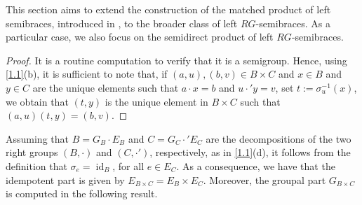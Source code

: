 \documentclass[11pt]{amsart}
\newcommand{\Aut}{\operatorname{Aut}}
\newcommand{\id}{\operatorname{id}}
\newtheorem{lemma}[theorem]{Lemma}
\theoremstyle{definition}
\begin{document}
This section aims to extend the construction of the matched product of left semibraces, introduced in \cite{CCSt20-1}, to the broader class of left $RG$-semibraces. As a particular case, we also focus on the semidirect product of left $RG$-semibraces.


\begin{proof}
It is a routine computation to verify that it is a semigroup. Hence, using  \cref{1.1}(b), it is sufficient to note that, if $(a,u),(b,v)\in B\times C$ and $x\in B$ and $y\in C$ are the unique elements such that $a\cdot x = b$ and $u\cdot' y = v$, set $t:= \sigma^{-1}_u(x)$, we obtain that $(t, y)$ is the unique element in $B\times C$ such that $(a,u)(t,y) = (b,v)$.
\end{proof}

Assuming that $B=G_B \cdot E_B$ and $C=G_C \cdot' E_C$ are the decompositions of the two right groups $(B, \cdot)$ and $(C, \cdot')$, respectively, as in \cref{1.1}(d), it follows from the definition that $\sigma_e=\id_B$, for all $e\in E_C$. As a consequence, we have that the idempotent part is given by $E_{B \times C}=E_B \times E_C$.  
Moreover, the groupal part $G_{B \times C}$ is computed in the following result.
\end{document}
